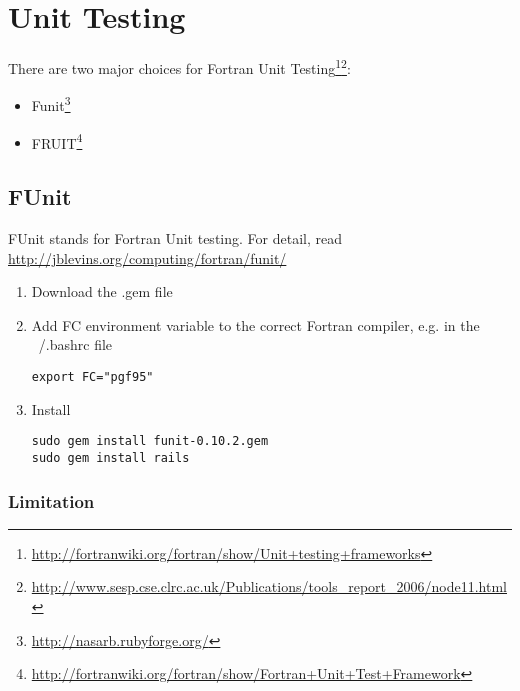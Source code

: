 
\chapter{Unit Testing}
\label{chap:unit-testing}

There are two major choices for Fortran Unit Testing\footnote{\url{http://fortranwiki.org/fortran/show/Unit+testing+frameworks}}\footnote{\url{http://www.sesp.cse.clrc.ac.uk/Publications/tools_report_2006/node11.html}}:
\begin{itemize}
\item Funit\footnote{\url{http://nasarb.rubyforge.org/}}
\item FRUIT\footnote{\url{http://fortranwiki.org/fortran/show/Fortran+Unit+Test+Framework}}
\end{itemize}

\section{FUnit}
\label{sec:funit}

FUnit stands for Fortran Unit testing. For detail, read
\url{http://jblevins.org/computing/fortran/funit/}
\begin{enumerate}
\item Download the .gem file

\item Add FC environment variable to the correct Fortran compiler,
  e.g. in the ~/.bashrc file
\begin{verbatim}
export FC="pgf95"
\end{verbatim}

\item Install
\begin{verbatim}
sudo gem install funit-0.10.2.gem
sudo gem install rails
\end{verbatim}
\end{enumerate}

\subsection{Limitation}
\label{sec:limitation}

